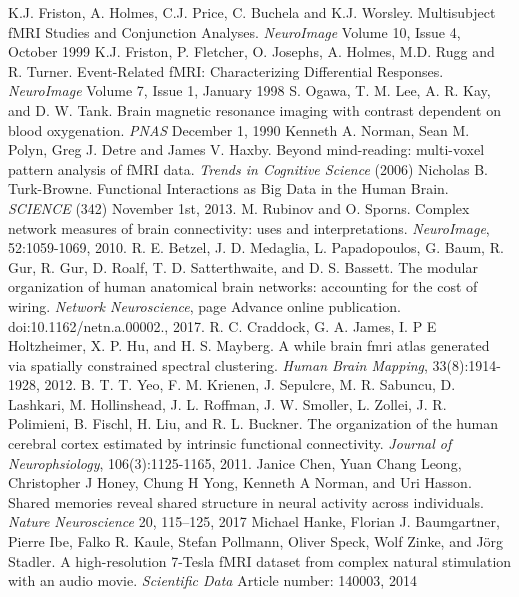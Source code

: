 \documentclass[11pt]{article}
\begin{document}
\begin{thebibliography}{1}
 K.J. Friston, A. Holmes, C.J. Price, C. Buchela and K.J. Worsley. Multisubject fMRI Studies and Conjunction Analyses. \textit{NeuroImage} Volume 10, Issue 4, October 1999
 K.J. Friston, P. Fletcher, O. Josephs, A. Holmes, M.D. Rugg and R. Turner. Event-Related fMRI: Characterizing Differential Responses. \textit{NeuroImage} Volume 7, Issue 1, January 1998
 S. Ogawa, T. M. Lee, A. R. Kay, and D. W. Tank. Brain magnetic resonance imaging with contrast dependent on blood oxygenation. \textit{PNAS} December 1, 1990
 Kenneth A. Norman, Sean M. Polyn, Greg J. Detre and James V. Haxby. Beyond mind-reading: multi-voxel pattern analysis of fMRI data. \textit{Trends in Cognitive Science} (2006)
 Nicholas B. Turk-Browne. Functional Interactions as Big Data in the Human Brain. \textit{SCIENCE} (342) November 1st, 2013.
 M. Rubinov and O. Sporns. Complex network measures of brain connectivity: uses and interpretations. \textit{NeuroImage}, 52:1059-1069, 2010.
 R. E. Betzel, J. D. Medaglia, L. Papadopoulos, G. Baum, R. Gur, R. Gur, D. Roalf, T. D. Satterthwaite, and D. S. Bassett. The modular organization of human anatomical brain networks: accounting for the cost of wiring. \textit{Network Neuroscience}, page Advance online publication. doi:10.1162/netn.a.00002., 2017.
 R. C. Craddock, G. A. James, I. P E Holtzheimer, X. P. Hu, and H. S. Mayberg. A while brain fmri atlas generated via spatially constrained spectral clustering. \textit{Human Brain Mapping}, 33(8):1914-1928, 2012.
 B. T. T. Yeo, F. M. Krienen, J. Sepulcre, M. R. Sabuncu, D. Lashkari, M. Hollinshead, J. L. Roffman, J. W. Smoller, L. Zollei, J. R. Polimieni, B. Fischl, H. Liu, and R. L. Buckner. The organization of the human cerebral cortex estimated by intrinsic functional connectivity. \textit{Journal of Neurophsiology}, 106(3):1125-1165, 2011.
 Janice Chen,	Yuan Chang Leong,	Christopher J Honey, Chung H Yong,	Kenneth A Norman, and Uri Hasson. Shared memories reveal shared structure in neural activity across individuals. \textit{Nature Neuroscience} 20, 115–125, 2017
 Michael Hanke, Florian J. Baumgartner, Pierre Ibe, Falko R. Kaule, Stefan Pollmann, Oliver Speck, Wolf Zinke, and Jörg Stadler. A high-resolution 7-Tesla fMRI dataset from complex natural stimulation with an audio movie. \textit{Scientific Data} Article number: 140003, 2014
\end{thebibliography}
\end{document}
